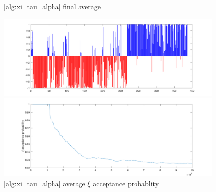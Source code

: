 \documentclass{siamart1116}
\begin{document}
\begin{figure}[!htb]
\begin{minipage}{0.48\textwidth}
    \caption{\label{fig:noncentered_voting_avg}\cref{alg:xi_tau_alpha} final average}
    \includegraphics[width=\linewidth]{voting/noncentered/final_avg.png}
\end{minipage}\hfill
\begin{minipage}{0.48\textwidth}
    \caption{\label{fig:noncentered_voting_accept} \cref{alg:xi_tau_alpha} average $\xi$ acceptance probablity}
    \includegraphics[width=\linewidth]{voting/noncentered/acceptance_xi_probability.png}
\end{minipage}
\end{figure}
\end{document}

